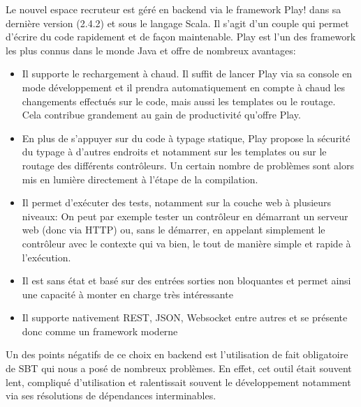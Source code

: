 Le nouvel espace recruteur est géré en backend via le framework Play! dans sa dernière version (2.4.2) et sous le langage Scala.
Il s'agit d'un couple qui permet d'écrire du code rapidement et de façon maintenable.
Play est l'un des framework les plus connus dans le monde Java et offre de nombreux avantages:
\begin{itemize}
  \item Il supporte le rechargement à chaud.
  Il suffit de lancer Play via sa console en mode développement et il prendra automatiquement en compte à chaud les changements effectués sur le code, mais aussi les templates ou le routage.
  Cela contribue grandement au gain de productivité qu'offre Play.
  \item En plus de s’appuyer sur du code à typage statique, Play propose la sécurité du typage à d’autres endroits et notamment sur les templates ou sur le routage des différents contrôleurs.
  Un certain nombre de problèmes sont alors mis en lumière directement à l’étape de la compilation.
  \item Il permet d'exécuter des tests, notamment sur la couche web à plusieurs niveaux:
  On peut par exemple tester un contrôleur en démarrant un serveur web (donc via HTTP) ou, sans le démarrer, en appelant simplement le contrôleur avec le contexte qui va bien, le tout de manière simple et rapide à l’exécution.
  \item Il est sans état et basé sur des entrées sorties non bloquantes et permet ainsi une capacité à monter en charge très intéressante
  \item Il supporte nativement REST, JSON, Websocket entre autres et se présente donc comme un framework moderne
\end{itemize}
Un des points négatifs de ce choix en backend est l'utilisation de fait obligatoire de SBT qui nous a posé de nombreux problèmes.
En effet, cet outil était souvent lent, compliqué d'utilisation et ralentissait souvent le développement notamment via ses résolutions de dépendances interminables.
